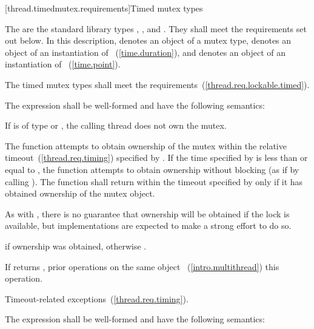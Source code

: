[thread.timedmutex.requirements]{Timed mutex types}

\pnum
The  are the standard library types ,
, and . They shall
meet the requirements set out below.
In this description,  denotes an object of a mutex type,
 denotes an object of an
instantiation of ~(\ref{time.duration}), and  denotes an
object of an
instantiation of ~(\ref{time.point}).

\pnum
The timed mutex types shall meet the 
requirements~(\ref{thread.req.lockable.timed}).

\pnum
The expression  shall be well-formed and have the
following semantics:

\begin{itemdescr}
\pnum
\precondition If  is of type  or
, the calling thread does not
own the mutex.

\pnum
\effects The function attempts to obtain ownership of the mutex within the
relative timeout~(\ref{thread.req.timing})
specified by . If the time specified by  is less than or
equal to , the function attempts to obtain ownership without blocking (as if by calling
). The function shall return within the timeout specified by
 only if it has obtained ownership of the mutex object. \begin{note} As
with , there is no guarantee that ownership will be obtained if the
lock is available, but implementations are expected to make a strong effort to do so.
\end{note}

\pnum
\returntype {}

\pnum
\returns {} if ownership was obtained, otherwise .

\pnum
\sync If  returns , prior  operations
on the same object ~(\ref{intro.multithread}) this operation.

\pnum\throws Timeout-related exceptions~(\ref{thread.req.timing}).
\end{itemdescr}

\pnum
The expression  shall be well-formed and have the
following semantics:

